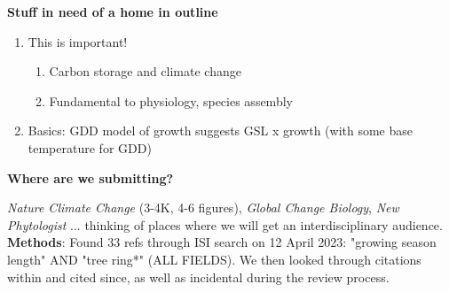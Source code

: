 \documentclass[11pt,letter]{article}
\begin{document}
{\bf Stuff in need of a home in outline} 
\begin{enumerate}
\item This is important! 
\begin{enumerate}
\item Carbon storage and climate change
\item Fundamental to physiology, species assembly
\end{enumerate}
\item Basics: GDD model of growth suggests GSL x growth (with some base temperature for GDD)
\end{enumerate}




{\bf Where are we submitting?}

\emph{Nature Climate Change} (3-4K, 4-6 figures), \emph{Global Change Biology}, \emph{New Phytologist} ... thinking of places where we will get an interdisciplinary audience.\\

{\bf Methods}: Found 33 refs through ISI search on 12 April 2023: "growing season length" AND "tree ring*" (ALL FIELDS). We then looked through citations within and cited since, as well as incidental during the review process.\\
\end{document}
